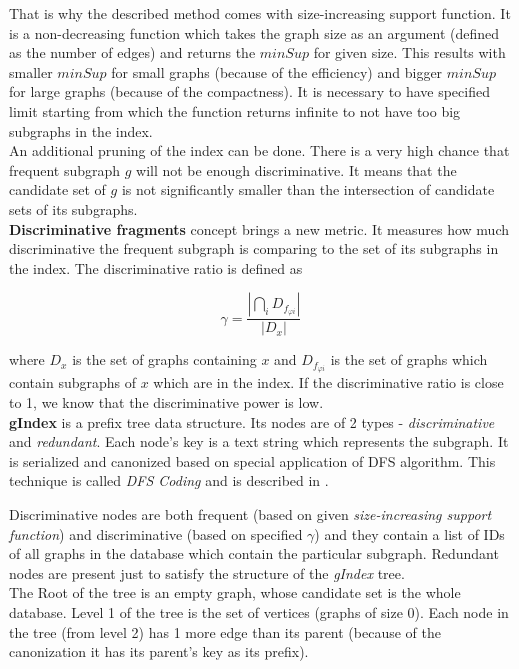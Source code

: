 That is why the described method comes with size-increasing support function. It is a non-decreasing function which takes the graph size as an argument (defined as the number of edges) and returns the $ minSup $ for given size. This results with smaller $ minSup $ for small graphs (because of the efficiency) and bigger $ minSup $ for large graphs (because of the compactness). It is necessary to have specified limit starting from which the function returns infinite to not have too big subgraphs in the index.\\


An additional pruning of the index can be done. There is a very high chance that frequent subgraph $ g $ will not be enough discriminative. It means that  the candidate set of $ g $ is not significantly smaller than the intersection of candidate sets of its subgraphs.\\

\textbf{Discriminative fragments} concept brings a new metric. It measures how much discriminative the frequent subgraph is comparing to the set of its subgraphs in the index. The discriminative ratio is defined as

$$ \gamma = \frac{|\bigcap _{i} D_{f_{\varphi i}} |}{| D_{x} |} $$

\noindent where $D_{x}$ is the set of graphs containing $ x $ and $ D_{f_{\varphi i}} $ is the set of graphs which contain subgraphs of $ x $ which are in the index. If the discriminative ratio is close to 1, we know that the discriminative power is low.\\

\textbf{gIndex} is a prefix tree data structure. Its nodes are of 2 types - \textit{discriminative} and \textit{redundant}. Each node’s key is a text string which represents the subgraph. It is serialized and canonized based on special application of DFS algorithm. This technique is called \textit{DFS Coding} and is described in \cite{gspan}.

Discriminative nodes are both frequent (based on given \textit{size-increasing support function}) and discriminative (based on specified $ \gamma $) and they contain a list of IDs of all graphs in the database which contain the particular subgraph. Redundant nodes are present just to satisfy the structure of the \textit{gIndex} tree.\\

The Root of the tree is an empty graph, whose candidate set is the whole database. Level 1 of the tree is the set of vertices (graphs of size 0). Each node in the tree (from level 2) has 1 more edge than its parent (because of the canonization it has its parent’s key as its prefix).\\

